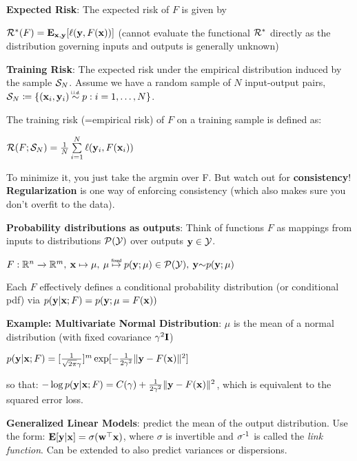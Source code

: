     \textbf{Expected Risk}: The expected risk of $F$ is given by

    \tab$\mathcal{R}^*(F)=\mathbf E_{\mathbf x,\mathbf y}\lbrack\ell(\mathbf y,F(\mathbf x))\rbrack$ (cannot evaluate the functional $\mathcal{R}^*$ directly as the distribution governing inputs and outputs is generally unknown)
    
    \textbf{Training Risk}: The expected risk under the empirical distribution induced by the sample $\mathcal{S}_N$. Assume we have a random sample of $N$ input-output pairs,\\$\cS_N\coloneqq\{(\vx_i,\vy_i) \mathrel{\overset{\makebox[0pt]{\mbox{\normalfont\tiny\sffamily i.i.d.}}}{\sim}}p:i=1,\ldots,N\}$.
    
    The training risk (=empirical risk) of $F$ on a training sample is defined as:
    
    \tab$\mathcal{R}(F;\mathcal{S}_N)=\frac{1}{N}\sum\limits_{i=1}^N\ell(\mathbf y_i,F(\mathbf x_i))$
    
    To minimize it, you just take the argmin over F. But watch out for \textbf{consistency}! \textbf{Regularization} is one way of enforcing consistency (which also makes sure you don't overfit to the data).
    
    \textbf{Probability distributions as outputs}: Think of functions $F$ as mappings from inputs to distributions $\mathcal{P}(\mathcal{Y})$ over outputs $\mathbf y\in\mathcal{Y}$.
    
    \tab$F:\R^n\xrightarrow{}\R^m,\>\vx\mapsto\mu,\>\mu\mathrel{\overset{\makebox[0pt]{\mbox{\normalfont\tiny\sffamily fixed}}}{\mapsto}}p(\vy;\mu)\in\cP(\cY),\>\vy{\sim}p(\vy;\mu)$
    
    Each $F$ effectively defines a conditional probability distribution (or conditional pdf) via $p(\mathbf y|\mathbf x;F)=p(\mathbf y;\mu=F(\mathbf x))$
    
    \textbf{Example: Multivariate Normal Distribution}: $\mu$ is the mean of a normal distribution (with fixed covariance $\gamma^2\mathbf I$)
    
    \tab$p(\mathbf y|\mathbf x;F)=\lbrack\frac{1}{\sqrt{2\pi}\gamma}\rbrack^m \exp\lbrack-\frac{1}{2\gamma^2}\lVert\mathbf y-F(\mathbf x)\rVert^2\rbrack$
    
    so that: $-\log p(\mathbf y|\mathbf x;F)=C(\gamma) + \frac{1}{2\gamma^2}\lVert\mathbf y-F(\mathbf x)\rVert^2$, which is equivalent to the squared error loss. 
    
    \textbf{Generalized Linear Models}: predict the mean of the output distribution. Use the form:
    \tab$\mathbf E\lbrack\mathbf y|\mathbf x\rbrack=\sigma(\mathbf w^{\mathop{\mathrm{\top}}}\mathbf x)$, where $\sigma$ is invertible and $\sigma^{\text{-}1}$ is called the \emph{link function}. Can be extended to also predict variances or dispersions.
    
